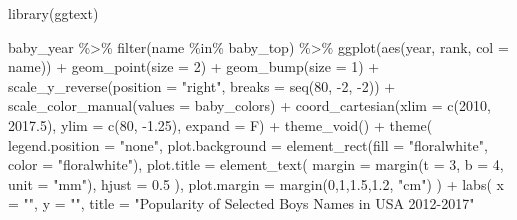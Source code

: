 \documentclass[
  letterpaper,
  DIV=11,
  numbers=noendperiod]{scrreprt}
\newenvironment{Shaded}{\begin{snugshade}}{\end{snugshade}}
\newcommand{\AttributeTok}[1]{\textcolor[rgb]{0.40,0.45,0.13}{#1}}
\newcommand{\DecValTok}[1]{\textcolor[rgb]{0.68,0.00,0.00}{#1}}
\newcommand{\FloatTok}[1]{\textcolor[rgb]{0.68,0.00,0.00}{#1}}
\newcommand{\FunctionTok}[1]{\textcolor[rgb]{0.28,0.35,0.67}{#1}}
\newcommand{\NormalTok}[1]{\textcolor[rgb]{0.00,0.23,0.31}{#1}}
\newcommand{\SpecialCharTok}[1]{\textcolor[rgb]{0.37,0.37,0.37}{#1}}
\newcommand{\StringTok}[1]{\textcolor[rgb]{0.13,0.47,0.30}{#1}}
\begin{document}
\begin{Shaded}
\begin{Highlighting}[]
\FunctionTok{library}\NormalTok{(ggtext)}

\NormalTok{baby\_year }\SpecialCharTok{\%\textgreater{}\%}
  \FunctionTok{filter}\NormalTok{(name }\SpecialCharTok{\%in\%}\NormalTok{ baby\_top) }\SpecialCharTok{\%\textgreater{}\%}
  \FunctionTok{ggplot}\NormalTok{(}\FunctionTok{aes}\NormalTok{(year, rank, }\AttributeTok{col =}\NormalTok{ name)) }\SpecialCharTok{+}
  \FunctionTok{geom\_point}\NormalTok{(}\AttributeTok{size =} \DecValTok{2}\NormalTok{) }\SpecialCharTok{+}
  \FunctionTok{geom\_bump}\NormalTok{(}\AttributeTok{size =} \DecValTok{1}\NormalTok{) }\SpecialCharTok{+}
  \FunctionTok{scale\_y\_reverse}\NormalTok{(}\AttributeTok{position =} \StringTok{"right"}\NormalTok{, }\AttributeTok{breaks =} \FunctionTok{seq}\NormalTok{(}\DecValTok{80}\NormalTok{, }\SpecialCharTok{{-}}\DecValTok{2}\NormalTok{, }\SpecialCharTok{{-}}\DecValTok{2}\NormalTok{)) }\SpecialCharTok{+}
  \FunctionTok{scale\_color\_manual}\NormalTok{(}\AttributeTok{values =}\NormalTok{ baby\_colors) }\SpecialCharTok{+}
  \FunctionTok{coord\_cartesian}\NormalTok{(}\AttributeTok{xlim =} \FunctionTok{c}\NormalTok{(}\DecValTok{2010}\NormalTok{, }\FloatTok{2017.5}\NormalTok{), }\AttributeTok{ylim =} \FunctionTok{c}\NormalTok{(}\DecValTok{80}\NormalTok{, }\SpecialCharTok{{-}}\FloatTok{1.25}\NormalTok{), }\AttributeTok{expand =}\NormalTok{ F) }\SpecialCharTok{+}
  \FunctionTok{theme\_void}\NormalTok{() }\SpecialCharTok{+}
  \FunctionTok{theme}\NormalTok{(}
    \AttributeTok{legend.position =} \StringTok{"none"}\NormalTok{,}
    \AttributeTok{plot.background =} \FunctionTok{element\_rect}\NormalTok{(}\AttributeTok{fill =} \StringTok{"floralwhite"}\NormalTok{, }\AttributeTok{color =} \StringTok{"floralwhite"}\NormalTok{),}
    \AttributeTok{plot.title =} \FunctionTok{element\_text}\NormalTok{(}
      \AttributeTok{margin =} \FunctionTok{margin}\NormalTok{(}\AttributeTok{t =} \DecValTok{3}\NormalTok{, }\AttributeTok{b =} \DecValTok{4}\NormalTok{, }\AttributeTok{unit =} \StringTok{"mm"}\NormalTok{),}
      \AttributeTok{hjust =} \FloatTok{0.5}
\NormalTok{    ),}
    \AttributeTok{plot.margin =} \FunctionTok{margin}\NormalTok{(}\DecValTok{0}\NormalTok{,}\DecValTok{1}\NormalTok{,}\FloatTok{1.5}\NormalTok{,}\FloatTok{1.2}\NormalTok{, }\StringTok{"cm"}\NormalTok{)}
\NormalTok{  ) }\SpecialCharTok{+}
  \FunctionTok{labs}\NormalTok{(}
    \AttributeTok{x =} \StringTok{""}\NormalTok{,}
    \AttributeTok{y =} \StringTok{""}\NormalTok{,}
    \AttributeTok{title =} \StringTok{"Popularity of Selected Boy\textquotesingle{}s Names in USA 2012{-}2017"}

\end{Highlighting}
\end{Shaded}
\end{document}
